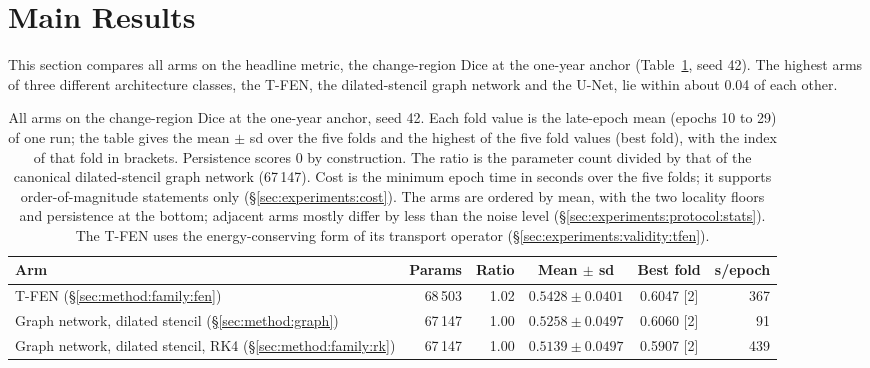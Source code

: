 \section{Main Results}
\label{sec:experiments:main-results}

This section compares all arms on the headline metric, the change-region
Dice at the one-year anchor (Table~\ref{tab:experiments:arms}, seed 42).
The highest arms of three different architecture classes, the T-FEN, the
dilated-stencil graph network and the U-Net, lie within about 0.04 of each
other.

\begin{table}[t]
  \centering
  \caption[All arms on the headline metric.]{%
    All arms on the change-region Dice at the one-year anchor, seed 42.
    Each fold value is the late-epoch mean (epochs 10 to 29) of one run;
    the table gives the mean $\pm$ sd over the five folds and the highest of
    the five fold values (best fold), with the index of that fold in
    brackets. Persistence scores 0 by construction.
    The ratio is the parameter count divided by that of the canonical
    dilated-stencil graph network (67\,147). Cost is the minimum epoch time
    in seconds over the five folds; it supports order-of-magnitude
    statements only (\S\ref{sec:experiments:cost}). The arms are ordered by
    mean, with the two locality floors and persistence at the bottom;
    adjacent arms mostly differ by less than the noise level
    (\S\ref{sec:experiments:protocol:stats}).
    The T-FEN uses the energy-conserving form of its transport operator
    (\S\ref{sec:experiments:validity:tfen}).}
  \label{tab:experiments:arms}
  \small
  \begin{tabular}{p{} r r c c r}
    \toprule
    Arm & Params & Ratio & Mean $\pm$ sd & Best fold & s/epoch \\
    \midrule
    T-FEN (\S\ref{sec:method:family:fen}) & 68\,503 & 1.02 &
      $0.5428 \pm 0.0401$ & 0.6047 [2] & 367 \\
    Graph network, dilated stencil (\S\ref{sec:method:graph}) & 67\,147 &
      1.00 & $0.5258 \pm 0.0497$ & 0.6060 [2] & 91 \\
    Graph network, dilated stencil, RK4
      (\S\ref{sec:method:family:rk}) & 67\,147 & 1.00 &
      $0.5139 \pm 0.0497$ & 0.5907 [2] & 439 \\

\end{tabular}
\end{table}
